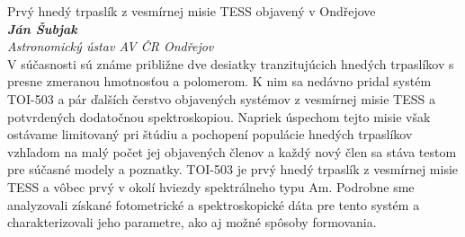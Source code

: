 \documentclass[a4paper]{report}
\begin{document}
                    \begin{tcolorbox}[
                                    colback=white,
                    colframe=black!70!white,
                                fonttitle=\Large\bfseries,
                title=17:00
            ]
                {\Large Prvý hnedý trpaslík z vesmírnej misie TESS objavený v Ondřejove}
                                                            \\ \textbf{\textit{Ján Šubjak}}
                                        \\ \textit{Astronomický ústav AV ČR Ondřejov}                                \\[2ex]V súčasnosti sú známe približne dve desiatky tranzitujúcich hnedých trpaslíkov s presne zmeranou hmotnosťou a polomerom. K nim sa nedávno pridal systém TOI-503 a pár ďalších čerstvo objavených systémov z vesmírnej misie TESS a potvrdených dodatočnou spektroskopiou. Napriek úspechom tejto misie však ostávame limitovaný pri štúdiu a pochopení populácie hnedých trpaslíkov vzhľadom na malý počet jej objavených členov a každý nový člen sa stáva testom pre súčasné modely a poznatky. TOI-503 je prvý hnedý trpaslík z vesmírnej misie TESS a vôbec prvý v okolí hviezdy spektrálneho typu Am. Podrobne sme analyzovali získané fotometrické a spektroskopické dáta pre tento systém a charakterizovali jeho parametre, ako aj možné spôsoby formovania.
            \end{tcolorbox}
\end{document}

